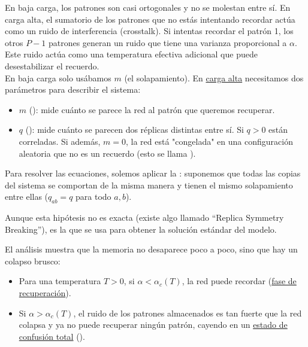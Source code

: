 \noindent
En baja carga, los patrones son casi ortogonales y no se molestan entre sí. En carga alta, el sumatorio de los patrones que no estás intentando recordar actúa como un ruido de interferencia (crosstalk). Si intentas recordar el patrón 1, los otros $P-1$ patrones generan un ruido que tiene una varianza proporcional a $\alpha$. Este ruido actúa como una temperatura efectiva adicional que puede desestabilizar el recuerdo. \\

\noindent
En baja carga solo usábamos $m$ (el solapamiento). En \underline{carga alta} necesitamos dos parámetros para describir el sistema:
\begin{itemize}
    \item $m$ (): mide cuánto se parece la red al patrón que queremos recuperar.
    \item $q$ (): mide cuánto se parecen dos réplicas distintas entre sí. Si $q > 0$ están correladas. Si además, $m = 0$, la red está "congelada" en una configuración aleatoria que no es un recuerdo (esto se llama ).
\end{itemize}

\noindent
Para resolver las ecuaciones, solemos aplicar la : suponemos que todas las copias del sistema se comportan de la misma manera y tienen el mismo solapamiento entre ellas ($q_{ab} = q$ para todo $a, b$).

\begin{observacion}
    Aunque esta hipótesis no es exacta (existe algo llamado ``Replica Symmetry Breaking''), es la que se usa para obtener la solución estándar del modelo.
\end{observacion}

\noindent
El análisis muestra que la memoria no desaparece poco a poco, sino que hay un colapso brusco:

\begin{itemize}
    \item Para una temperatura $T > 0$, si $\alpha < \alpha_c(T)$, la red puede recordar (\underline{fase de recuperación}).
    \item Si $\alpha > \alpha_c(T)$, el ruido de los patrones almacenados es tan fuerte que la red colapsa y ya no puede recuperar ningún patrón, cayendo en un \underline{estado de confusión total} ().
\end{itemize}

